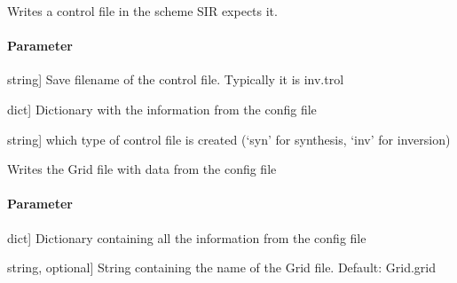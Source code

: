 \documentclass[letterpaper,10pt,english]{sphinxmanual}
\begin{document}

\begin{fulllineitems}
\label{\detokenize{functions:sir.write_control_mc}}
\pysigstartsignatures
{}
\pysigstopsignatures
\sphinxAtStartPar
Writes a control file in the scheme SIR expects it.


\paragraph{Parameter}
\label{\detokenize{functions:id23}}\begin{description}
\sphinxlineitem{filename}{[}string{]}
\sphinxAtStartPar
Save filename of the control file. Typically it is inv.trol

\sphinxlineitem{config}{[}dict{]}
\sphinxAtStartPar
Dictionary with the information from the config file

\sphinxlineitem{Type}{[}string{]}
\sphinxAtStartPar
which type of control file is created (‘syn’ for synthesis, ‘inv’ for inversion)

\end{description}

\end{fulllineitems}


\begin{fulllineitems}
\label{\detokenize{functions:sir.write_grid}}
\pysigstartsignatures
{}
\pysigstopsignatures
\sphinxAtStartPar
Writes the Grid file with data from the config file


\paragraph{Parameter}
\label{\detokenize{functions:id24}}\begin{description}
\sphinxlineitem{config}{[}dict{]}
\sphinxAtStartPar
Dictionary containing all the information from the config file

\sphinxlineitem{filename}{[}string, optional{]}
\sphinxAtStartPar
String containing the name of the Grid file. Default: Grid.grid

\end{description}

\end{fulllineitems}
\end{document}
